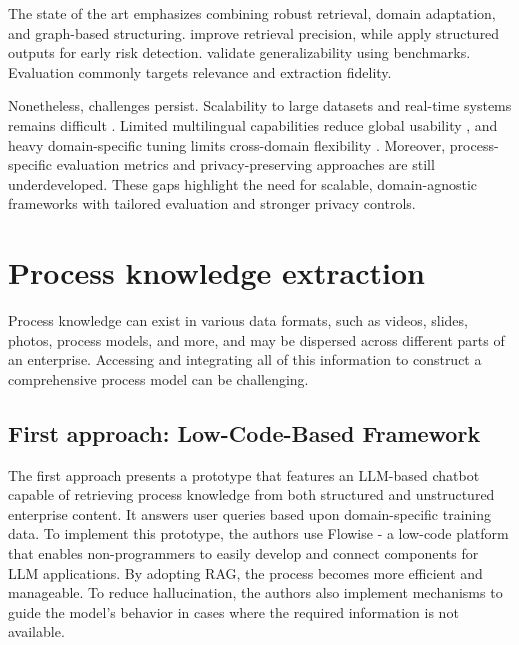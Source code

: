 \documentclass[%
    paper=A4,                    %
    twoside=true,               %
    openright,                  %
    parskip=full,               %
    chapterprefix=true,         %
    11pt,                       %
    headings=normal,            %
    bibliography=totoc,         %
    listof=totoc,              %
    titlepage=on,              %
    captions=tableabove,        %
    draft=false,               %
]{scrreprt}%
\begin{document}
The state of the art emphasizes combining robust retrieval, domain adaptation, and graph-based structuring. \citet{chen2025application} improve retrieval precision, while \citet{bahr2025knowledge} apply structured outputs for early risk detection. \citet{efeoglu2024retrieval} validate generalizability using benchmarks. Evaluation commonly targets relevance and extraction fidelity.

Nonetheless, challenges persist. Scalability to large datasets and real-time systems remains difficult \citep{chen2025application}. Limited multilingual capabilities reduce global usability \citep{efeoglu2024retrieval}, and heavy domain-specific tuning limits cross-domain flexibility \citep{bahr2025knowledge}. Moreover, process-specific evaluation metrics and privacy-preserving approaches are still underdeveloped. These gaps highlight the need for scalable, domain-agnostic frameworks with tailored evaluation and stronger privacy controls.












\chapter{Process knowledge extraction}
\label{processknowledge}

Process knowledge can exist in various data formats, such as videos, slides, photos, process models, and more, and may be dispersed across different parts of an enterprise. Accessing and integrating all of this information to construct a comprehensive process model can be challenging.

\section{First approach: Low-Code-Based Framework}

The first approach \cite{franzoi2024using} presents a prototype that features an LLM-based chatbot capable of retrieving process knowledge from both structured and unstructured enterprise content. It answers user queries based upon domain-specific training data.
To implement this prototype, the authors \cite{franzoi2024using} use Flowise - a low-code platform that enables non-programmers to easily develop and connect components for LLM applications. By adopting RAG, the process becomes more efficient and manageable.
To reduce hallucination, the authors also implement mechanisms to guide the model’s behavior in cases where the required information is not available.
\end{document}
